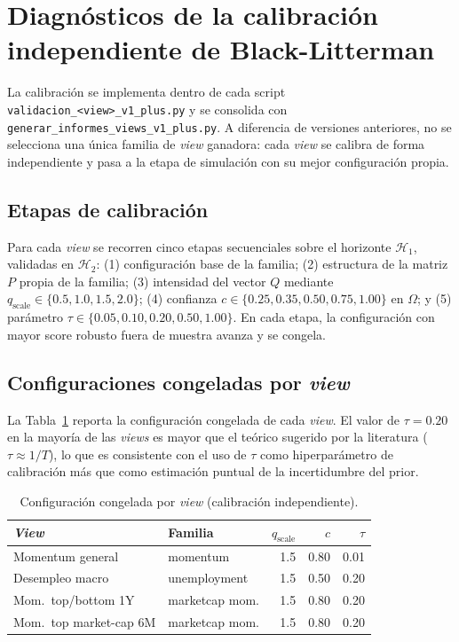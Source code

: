 \section{Diagn\'osticos de la calibraci\'on independiente de Black-Litterman}

La calibraci\'on se implementa dentro de cada script
\texttt{validacion\_<view>\_v1\_plus.py} y se consolida con
\texttt{generar\_informes\_views\_v1\_plus.py}. A diferencia de versiones
anteriores, no se selecciona una \'unica familia de \textit{view} ganadora: cada
\textit{view} se calibra de forma independiente y pasa a la etapa de simulaci\'on
con su mejor configuraci\'on propia.

\subsection{Etapas de calibraci\'on}

Para cada \textit{view} se recorren cinco etapas secuenciales sobre el horizonte
$\mathcal{H}_1$, validadas en $\mathcal{H}_2$: (1) configuraci\'on base de la
familia; (2) estructura de la matriz $P$ propia de la familia; (3) intensidad del
vector $Q$ mediante $q_{\text{scale}} \in \{0.5, 1.0, 1.5, 2.0\}$;
(4) confianza $c \in \{0.25, 0.35, 0.50, 0.75, 1.00\}$ en $\Omega$; y
(5) par\'ametro $\tau \in \{0.05, 0.10, 0.20, 0.50, 1.00\}$. En cada etapa, la
configuraci\'on con mayor score robusto fuera de muestra avanza y se congela.

\subsection{Configuraciones congeladas por \textit{view}}

La Tabla~\ref{tab:anexo_configs} reporta la configuraci\'on congelada de cada
\textit{view}. El valor de $\tau = 0.20$ en la mayor\'ia de las \textit{views} es
mayor que el te\'orico sugerido por la literatura ($\tau \approx 1/T$), lo que es
consistente con el uso de $\tau$ como hiperpar\'ametro de calibraci\'on m\'as que
como estimaci\'on puntual de la incertidumbre del prior.

\begin{table}[h]
\centering
\caption{Configuraci\'on congelada por \textit{view} (calibraci\'on independiente).}
\label{tab:anexo_configs}
\small
\begin{tabular}{@{}llrrr@{}}
\toprule
\textit{View} & Familia & $q_{\text{scale}}$ & $c$ & $\tau$ \\
\midrule
Momentum general & momentum & 1.5 & 0.80 & 0.01 \\
Desempleo macro & unemployment & 1.5 & 0.50 & 0.20 \\
Mom.\ top/bottom 1Y & marketcap mom. & 1.5 & 0.80 & 0.20 \\
Mom.\ top market-cap 6M & marketcap mom. & 1.5 & 0.80 & 0.20 \\
\bottomrule
\end{tabular}
\end{table}

